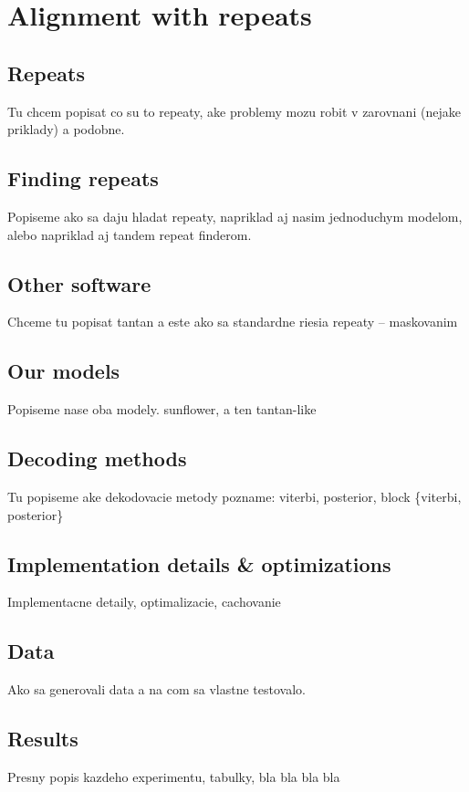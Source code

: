\chapter{Alignment with repeats}

\section{Repeats}
\begin{reformulate*}
Tu chcem popisat co su to repeaty, ake problemy mozu robit v zarovnani (nejake
priklady) a podobne.
\end{reformulate*}
\section{Finding repeats}
\begin{reformulate*}
Popiseme ako sa daju hladat repeaty, napriklad aj nasim jednoduchym modelom,
alebo napriklad aj tandem repeat finderom.
\end{reformulate*}
\section{Other software}
\begin{reformulate*}
Chceme tu popisat tantan a este ako sa standardne riesia repeaty -- maskovanim
\end{reformulate*}
\section{Our models}
\begin{reformulate*}
Popiseme nase oba modely. sunflower, a ten tantan-like
\end{reformulate*}
\section{Decoding methods}
\begin{reformulate*}
Tu popiseme ake dekodovacie metody pozname: viterbi, posterior, block \{viterbi,
posterior\}
\end{reformulate*}
\section{Implementation details \& optimizations}
\begin{reformulate*}
Implementacne detaily, optimalizacie, cachovanie
\end{reformulate*}
\section{Data}
\begin{reformulate*}
Ako sa generovali data a na com sa vlastne testovalo.
\end{reformulate*}
\section{Results}
\begin{reformulate*}
Presny popis kazdeho experimentu, tabulky, bla bla bla bla
\end{reformulate*}

\label{LastPage}
